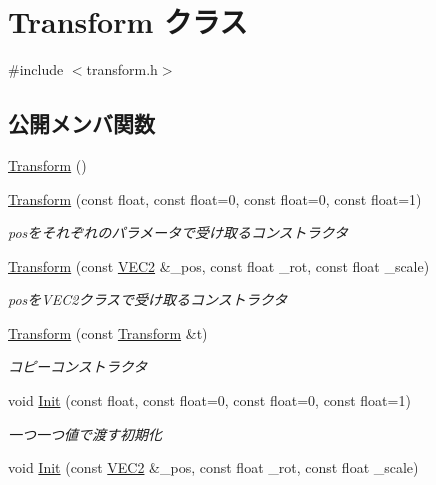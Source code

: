 \hypertarget{class_transform}{}\section{Transform クラス}
\label{class_transform}


{\ttfamily \#include $<$transform.\+h$>$}

\subsection*{公開メンバ関数}
\begin{DoxyCompactItemize}
\item 
\mbox{\hyperlink{class_transform_aa08ca4266efabc768973cdeea51945ab}{Transform}} ()
\item 
\mbox{\hyperlink{class_transform_afdda2868df3ca6b122c5e52f7919a692}{Transform}} (const float, const float=0, const float=0, const float=1)
\begin{DoxyCompactList}\small\item\em posをそれぞれのパラメータで受け取るコンストラクタ \end{DoxyCompactList}\item 
\mbox{\hyperlink{class_transform_aae9fd575f9e6e4862ea2d9232340e6dd}{Transform}} (const \mbox{\hyperlink{transform_8h_afb0c5e21d4133ff4f200992c0b534e1b}{V\+E\+C2}} \&\+\_\+pos, const float \+\_\+rot, const float \+\_\+scale)
\begin{DoxyCompactList}\small\item\em posを\+V\+E\+C2クラスで受け取るコンストラクタ \end{DoxyCompactList}\item 
\mbox{\hyperlink{class_transform_a7790f3c5dfe2b7fe7997af5f23e2ec7d}{Transform}} (const \mbox{\hyperlink{class_transform}{Transform}} \&t)
\begin{DoxyCompactList}\small\item\em コピーコンストラクタ \end{DoxyCompactList}\item 
void \mbox{\hyperlink{class_transform_a39816379bc1e3a0bbae23fa94db576f1}{Init}} (const float, const float=0, const float=0, const float=1)
\begin{DoxyCompactList}\small\item\em 一つ一つ値で渡す初期化 \end{DoxyCompactList}\item 
void \mbox{\hyperlink{class_transform_a0ccfc45e47071b7ebed1a61a14a202c4}{Init}} (const \mbox{\hyperlink{transform_8h_afb0c5e21d4133ff4f200992c0b534e1b}{V\+E\+C2}} \&\+\_\+pos, const float \+\_\+rot, const float \+\_\+scale)

\end{DoxyCompactItemize}
